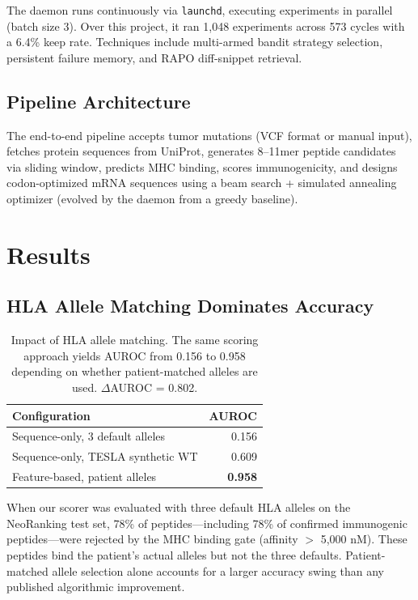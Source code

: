 \documentclass[11pt,twocolumn]{article}
\begin{document}
The daemon runs continuously via \texttt{launchd}, executing experiments in parallel (batch size 3). Over this project, it ran 1,048 experiments across 573 cycles with a 6.4\% keep rate. Techniques include multi-armed bandit strategy selection, persistent failure memory, and RAPO diff-snippet retrieval.

\subsection{Pipeline Architecture}

The end-to-end pipeline accepts tumor mutations (VCF format or manual input), fetches protein sequences from UniProt, generates 8--11mer peptide candidates via sliding window, predicts MHC binding, scores immunogenicity, and designs codon-optimized mRNA sequences using a beam search + simulated annealing optimizer (evolved by the daemon from a greedy baseline).

\section{Results}

\subsection{HLA Allele Matching Dominates Accuracy}

\begin{table}[ht]
\centering
\small
\begin{tabular}{@{}lr@{}}
\toprule
Configuration & AUROC \\
\midrule
Sequence-only, 3 default alleles & 0.156 \\
Sequence-only, TESLA synthetic WT & 0.609 \\
Feature-based, patient alleles & \textbf{0.958} \\
\bottomrule
\end{tabular}
\caption{Impact of HLA allele matching. The same scoring approach yields AUROC from 0.156 to 0.958 depending on whether patient-matched alleles are used. $\Delta$AUROC = 0.802.}
\end{table}

When our scorer was evaluated with three default HLA alleles on the NeoRanking test set, 78\% of peptides---including 78\% of confirmed immunogenic peptides---were rejected by the MHC binding gate (affinity $>$ 5,000 nM). These peptides bind the patient's actual alleles but not the three defaults. Patient-matched allele selection alone accounts for a larger accuracy swing than any published algorithmic improvement.
\end{document}
